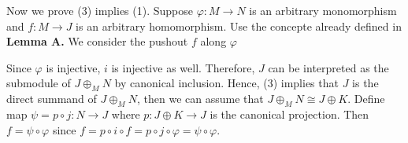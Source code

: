 \begin{solution}
Now we prove (3) implies (1).  Suppose $\varphi:M\to N$ is an arbitrary monomorphism and $f:M\to J$ is an arbitrary homomorphism. 
Use the concepte already defined in \textbf{Lemma A.}
We consider the pushout $f$ along $\varphi$
\begin{center}
\end{center}
Since $\varphi$ is injective, $i$ is injective as well. Therefore, $J$ can be interpreted as the submodule of $J\oplus_{M}N$ by canonical inclusion. 
Hence, (3) implies that $J$ is the direct summand of $J\oplus_{M}N$, then we can assume that $J\oplus_{M}N\cong J\oplus K$. Define map $\psi=p\circ j:N\to J$ where 
$p:J\oplus K\to J$ is the canonical projection. Then $f=\psi\circ \varphi$ since $f=p\circ i\circ f = p\circ j\circ \varphi = \psi\circ \varphi$.
\end{solution}



